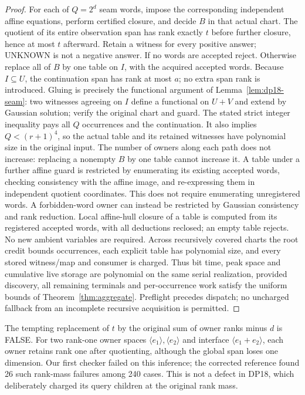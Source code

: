 \documentclass[11pt]{article}
\begin{document}
\begin{proof}
For each of $Q=2^d$ seam words, impose the corresponding independent affine equations, perform certified closure, and decide $B$ in that actual chart. The quotient of its entire observation span has rank exactly $t$ before further closure, hence at most $t$ afterward. Retain a witness for every positive answer; UNKNOWN is not a negative answer. If no words are accepted reject. Otherwise replace all of $B$ by one table on $I$, with the acquired accepted words. Because $I\subseteq U$, the continuation span has rank at most $a$; no extra span rank is introduced. Gluing is precisely the functional argument of Lemma~\ref{lem:dp18-seam}: two witnesses agreeing on $I$ define a functional on $U+V$ and extend by Gaussian solution; verify the original chart and guard. The stated strict integer inequality pays all $Q$ occurrences and the continuation. It also implies $Q<(r+1)^4$, so the actual table and its retained witnesses have polynomial size in the original input. The number of owners along each path does not increase: replacing a nonempty $B$ by one table cannot increase it. A table under a further affine guard is restricted by enumerating its existing accepted words, checking consistency with the affine image, and re-expressing them in independent quotient coordinates. This does not require enumerating unregistered words. A forbidden-word owner can instead be restricted by Gaussian consistency and rank reduction. Local affine-hull closure of a table is computed from its registered accepted words, with all deductions reclosed; an empty table rejects. No new ambient variables are required. Across recursively covered charts the root credit bounds occurrences, each explicit table has polynomial size, and every stored witness/map and consumer is charged. Thus bit time, peak space and cumulative live storage are polynomial on the same serial realization, provided discovery, all remaining terminals and per-occurrence work satisfy the uniform bounds of Theorem~\ref{thm:aggregate}. Preflight precedes dispatch; no uncharged fallback from an incomplete recursive acquisition is permitted.
\end{proof}
The tempting replacement of $t$ by the original sum of owner ranks minus $d$ is FALSE. For two rank-one owner spaces $\langle e_1\rangle,\langle e_2\rangle$ and interface $\langle e_1+e_2\rangle$, each owner retains rank one after quotienting, although the global span loses one dimension. Our first checker failed on this inference; the corrected reference found 26 such rank-mass failures among 240 cases. This is not a defect in DP18, which deliberately charged its query children at the original rank mass.
\end{document}
